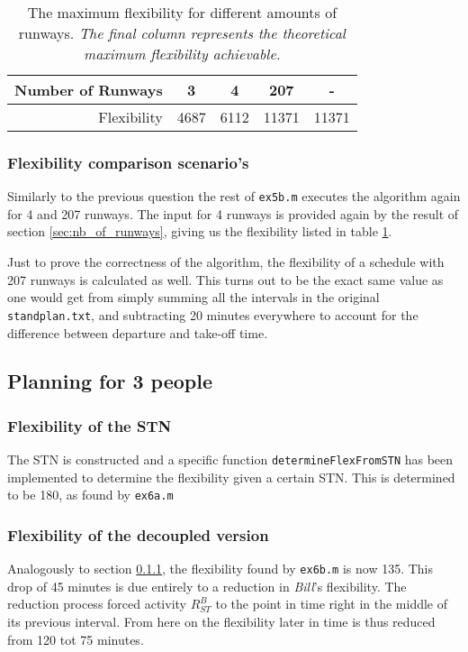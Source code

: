 \documentclass[10pt,a4paper]{article}
\begin{document}
\begin{table}
\centering
\begin{tabular}{ r || c | c | c | c}

Number of Runways & 3 & 4 & 207 & - \\ \hline
Flexibility & 4687 &  6112 & 11371 & 11371
\end{tabular}
\caption{The maximum flexibility for different amounts of runways. \emph{The final column represents the theoretical maximum flexibility achievable.}}
\label{table:flex}
\end{table}
\subsubsection{Flexibility comparison scenario's}
Similarly to the previous question the rest of \texttt{ex5b.m} executes the algorithm again for 4 and 207 runways. The input for 4 runways is provided again by the result of section \ref{sec:nb_of_runways}, giving us the flexibility listed in table \ref{table:flex}.

Just to prove the correctness of the algorithm, the flexibility of a schedule with 207 runways is calculated as well. This turns out to be the exact same value as one would get from simply summing all the intervals in the original \texttt{standplan.txt}, and subtracting 20 minutes everywhere to account for the difference between departure and take-off time.

\subsection{Planning for 3 people}
\subsubsection{Flexibility of the STN}
\label{sec:flex_boerkoel_1}

The STN is constructed and a specific function \texttt{determineFlexFromSTN} has been implemented to determine the flexibility given a certain STN. This is determined to be 180, as found by \texttt{ex6a.m}

\subsubsection{Flexibility of the decoupled version}
Analogously to section \ref{sec:flex_boerkoel_1}, the flexibility found by \texttt{ex6b.m} is now 135. This drop of 45 minutes is due entirely to a reduction in \emph{Bill}'s flexibility. The reduction process forced activity $R^{B}_{ST}$ to the point in time right in the middle of its previous interval. From here on the flexibility later in time is thus reduced from 120 tot 75 minutes.
\end{document}
